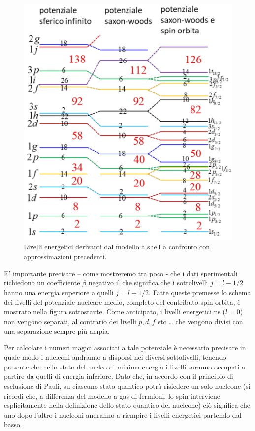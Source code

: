 \begin{figure}
	\centering
	\includegraphics{figs/shell-model-energy-level-final}
	\caption{Livelli energetici derivanti dal modello a shell a confronto con approssimazioni precedenti.}
	\label{fig:shell-model-energy-level-final}
\end{figure}
E’ importante precisare – come mostreremo tra poco - che i dati sperimentali richiedono un coefficiente $\beta$ negativo il che significa che i sottolivelli $j=l-1/2$ hanno una energia superiore a quelli $j=l+1/2$.
Fatte queste premesse lo schema dei livelli del potenziale nucleare medio, completo del contributo spin-orbita, è mostrato nella figura sottostante.
Come anticipato, i livelli energetici ns ($l=0$) non vengono separati, al contrario dei livelli $p, d, f$ etc \ldots
che vengono divisi con una separazione sempre più ampia.

Per calcolare i numeri magici associati a tale potenziale è necessario precisare in quale modo i nucleoni andranno a disporsi nei diversi sottolivelli, tenendo presente che nello stato del nucleo di minima energia i livelli saranno occupati a partire da quelli di energia inferiore. Dato che, in accordo con il principio di esclusione di Pauli, su ciascuno stato quantico potrà risiedere un solo nucleone (si ricordi che, a differenza del modello a gas di fermioni, lo spin interviene esplicitamente nella definizione dello stato quantico del nucleone) ciò significa che uno dopo l’altro i nucleoni andranno a riempire i livelli energetici partendo dal basso.

